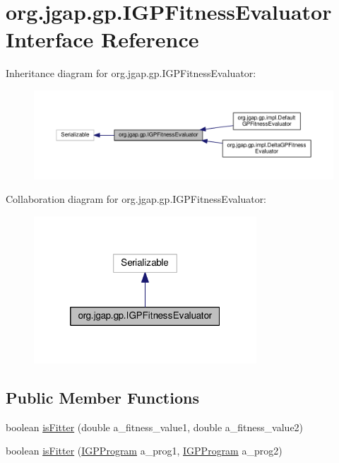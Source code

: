 \hypertarget{interfaceorg_1_1jgap_1_1gp_1_1_i_g_p_fitness_evaluator}{\section{org.\-jgap.\-gp.\-I\-G\-P\-Fitness\-Evaluator Interface Reference}
\label{interfaceorg_1_1jgap_1_1gp_1_1_i_g_p_fitness_evaluator}
}


Inheritance diagram for org.\-jgap.\-gp.\-I\-G\-P\-Fitness\-Evaluator\-:
\nopagebreak
\begin{figure}[H]
\begin{center}
\leavevmode
\includegraphics[width=350pt]{interfaceorg_1_1jgap_1_1gp_1_1_i_g_p_fitness_evaluator__inherit__graph}
\end{center}
\end{figure}


Collaboration diagram for org.\-jgap.\-gp.\-I\-G\-P\-Fitness\-Evaluator\-:
\nopagebreak
\begin{figure}[H]
\begin{center}
\leavevmode
\includegraphics[width=236pt]{interfaceorg_1_1jgap_1_1gp_1_1_i_g_p_fitness_evaluator__coll__graph}
\end{center}
\end{figure}
\subsection*{Public Member Functions}
\begin{DoxyCompactItemize}
\item 
boolean \hyperlink{interfaceorg_1_1jgap_1_1gp_1_1_i_g_p_fitness_evaluator_a662e6dc1e9722db5645479562c7aa9f8}{is\-Fitter} (double a\-\_\-fitness\-\_\-value1, double a\-\_\-fitness\-\_\-value2)
\item 
boolean \hyperlink{interfaceorg_1_1jgap_1_1gp_1_1_i_g_p_fitness_evaluator_ac633e9f987a542defc2cae4de4180b83}{is\-Fitter} (\hyperlink{interfaceorg_1_1jgap_1_1gp_1_1_i_g_p_program}{I\-G\-P\-Program} a\-\_\-prog1, \hyperlink{interfaceorg_1_1jgap_1_1gp_1_1_i_g_p_program}{I\-G\-P\-Program} a\-\_\-prog2)
\end{DoxyCompactItemize}
